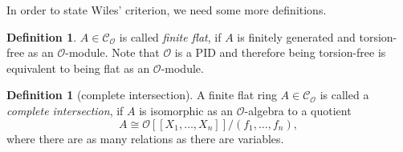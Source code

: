 \documentclass{article}
\theoremstyle{plain}%
\theoremstyle{definition}
\newtheorem{definition}[theorem]{Definition}
\theoremstyle{remark}
\newcommand{\co}{\mathcal{C}_\mathcal{O}}
\begin{document}
In order to state Wiles' criterion, we need some more definitions.
\begin{definition}
    \(A \in \co\) is called \textit{finite flat}, if \(A\) is finitely generated 
    and torsion-free as an \(\mathcal{O}\)-module.
    Note that \(\mathcal{O}\) is a PID and therefore being torsion-free 
    is equivalent to being flat as an \(\mathcal{O}\)-module.
\end{definition}

\begin{definition}[complete intersection]\cite[see][Def. 5.1]{Darmon1995}
    A finite flat ring \(A \in \co\) is called a \textit{complete intersection}, 
    if \(A\) is isomorphic as an \(\mathcal{O}\)-algebra to a quotient
    \[A \cong \mathcal{O}[[X_1, \dots, X_n]]/(f_1, \dots, f_n),\] 
    where there are as many relations as there are variables.
\end{definition}
\end{document}
